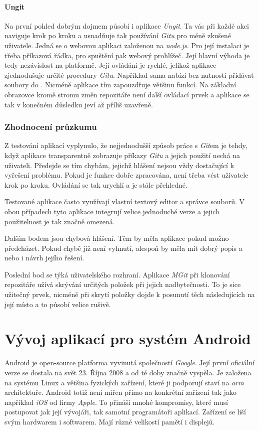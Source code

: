         \subsubsection{Ungit~}
        Na první pohled dobrým dojmem působí i aplikace \emph{Ungit}. Ta vás při každé akci naviguje krok po kroku a usnadňuje tak používání \emph{Gitu} pro méně zkušené uživatele. Jedná se o webovou aplikaci založenou na \emph{node.js}. Pro její instalaci je třeba příkazová řádka, pro spuštění pak webový prohlížeč. Její hlavní výhoda je tedy nezávislost na platformě. Její ovládání je rychlé, jelikož aplikace zjednodušuje určité procedury \emph{Gitu}. Například sama nabízí  bez nutnosti přidávat soubory do . Nicméně aplikace tím zapouzdřuje většinu funkcí. Na základní obrazovce kromě stromu změn repozitáře není další ovládací prvek a aplikace se tak v konečném důsledku jeví až příliš uzavřeně.

    \subsection{Zhodnocení průzkumu}
    Z testování aplikací vyplynulo, že nejjednodušší způsob práce s \emph{Git}em je tehdy, když aplikace transparentně zobrazuje příkazy \emph{Gitu} a jejich použití nechá na uživateli. Předejde se tím chybám, jejichž hlášení nejsou vždy dostačující k vyřešení problému. Pokud je funkce dobře zpracována, není třeba vést uživatele krok po kroku. Ovládání se tak urychlí a je stále přehledné.

    Testované aplikace často využívají vlastní textový editor a správce souborů. V obou případech tyto aplikace integrují velice jednoduché verze a jejich použitelnost je tak značně omezená.

    Dalším bodem jsou chybová hlášení. Těm by měla aplikace pokud možno předcházet. Pokud chybě již není vyhnutí, alespoň by měla mít dobrý popis a nebo i návrh jejího řešení.

    Poslední bod se týká uživatelského rozhraní. Aplikace \emph{MGit} při klonování repozitáře užívá skrývání určitých položek při jejich nadbytečnosti. To je sice užitečný prvek, nicméně při skrytí položky dojde k posunutí těch následujících na její místo a to působí velice rušivě.

\chapter{Vývoj aplikací pro systém Android}
Android je open-source platforma vyvinutá společností \emph{Google}. Její první oficiální verze se dostala na svět 23. Října 2008 a od té doby značně vyspěla. Je založena na systému Linux a většina fyzických zařízení, které ji podporují staví na \emph{arm} architektuře. Android totiž není mířen přímo na konkrétní zařízení tak jako například \emph{iOS} od firmy \emph{Apple}. To přináší mnohé kompromisy, které musí postupovat jak její vývojáři, tak samotní programátoři aplikací. Zařízení se liší svým hardwarem i softwarem. Mají různé velikostí pamětí i displejů.

